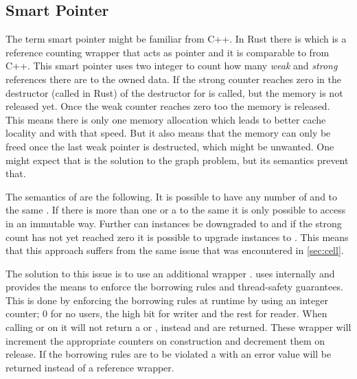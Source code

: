\documentclass[thesis]{subfiles}
\begin{document}
    

  \subsection{Smart Pointer}
    The term smart pointer might be familiar from C++.
    In Rust there is \RcT which is a reference counting wrapper that acts as pointer and it is comparable to  from C++.
    This smart pointer uses two integer to count how many \emph{weak} and \emph{strong} references there are to the owned data.
    If the strong counter reaches zero in the destructor (called  in Rust) of \RcT the destructor for \T is called, but the memory is not released yet.
    Once the weak counter reaches zero too the memory is released.
    This means there is only one memory allocation which leads to better cache locality and with that speed.
    But it also means that the memory can only be freed once the last weak pointer is destructed, which might be unwanted.
    One might expect that \RcT is the solution to the graph problem, but its semantics prevent that.\autocite{rust-doc}

    The semantics of \RcT are the following.
    It is possible to have any number of \RcTs and \WeakTs to the same \T.
    If there is more than one \RcT or a \WeakT to the same \T it is only possible to access \T in an immutable way.
    Further can \RcT instances be downgraded to \WeakT and if the strong count has not yet reached zero it is possible to upgrade \WeakT instances to \RcT.
    This means that this approach suffers from the same issue that was encountered in \autoref{sec:cell}.\autocite{rust-doc}

    The solution to this issue is to use an additional wrapper \RcRefCellT.
    \RefCellT uses internally  and provides the means to enforce the borrowing rules and thread-safety guarantees.
    This is done by enforcing the borrowing rules at runtime by using an integer counter; 0 for no users, the high bit for writer and the rest for reader.
    When calling  or  on \RefCellT it will not return a  or , instead  and  are returned.
    These wrapper will increment the appropriate counters on construction and decrement them on release.
    If the borrowing rules are to be violated a  with an error value will be returned instead of a reference wrapper.\autocite{rust-doc}
\end{document}
